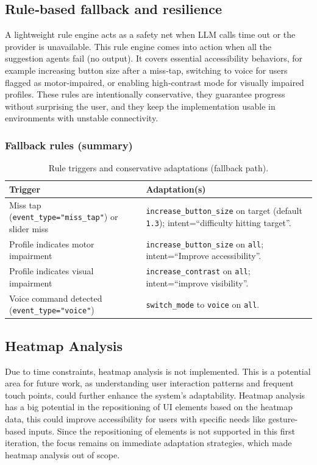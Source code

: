 \subsection{Rule‑based fallback and resilience}
A lightweight rule engine acts as a safety net when LLM calls time out or the provider is unavailable. This rule engine comes into action when all the suggestion agents fail (no output). It covers essential accessibility behaviors, for example increasing button size after a miss‑tap, switching to voice for users flagged as motor‑impaired, or enabling high‑contrast mode for visually impaired profiles. These rules are intentionally conservative, they guarantee progress without surprising the user, and they keep the implementation usable in environments with unstable connectivity.

\subsubsection*{Fallback rules (summary)}
\begin{table}[H]
\centering
\caption{Rule triggers and conservative adaptations (fallback path).}
\begin{tabular}{p{5.7cm}p{9.2cm}}
\toprule
\textbf{Trigger} & \textbf{Adaptation(s)} \\
\midrule
Miss tap (\texttt{event\_type="miss\_tap"}) or slider miss & \texttt{increase\_button\_size} on target (default \texttt{1.3}); intent=``difficulty hitting target''. \\
Profile indicates motor impairment & \texttt{increase\_button\_size} on \texttt{all}; intent=``Improve accessibility''. \\
Profile indicates visual impairment & \texttt{increase\_contrast} on \texttt{all}; intent=``improve visibility''. \\
Voice command detected (\texttt{event\_type="voice"}) & \texttt{switch\_mode} to \texttt{voice} on \texttt{all}. \\
\bottomrule
\end{tabular}
\end{table}

\subsection{Heatmap Analysis}
Due to time constraints, heatmap analysis is not implemented. This is a potential area for future work, as understanding user interaction patterns and frequent touch points, could further enhance the system's adaptability. Heatmap analysis has a big potential in the repositioning of UI elements based on the heatmap data, this could improve accessibility for users with specific needs like gesture-based inputs. Since the repositioning of elements is not supported in this first iteration, the focus remains on immediate adaptation strategies, which made heatmap analysis out of scope.

